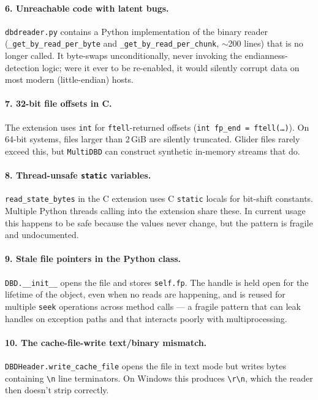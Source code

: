 \documentclass[11pt]{article}
\begin{document}
\paragraph{6. Unreachable code with latent bugs.}
\texttt{dbdreader.py} contains a Python implementation of the binary
reader (\texttt{\_get\_by\_read\_per\_byte} and
\texttt{\_get\_by\_read\_per\_chunk}, $\sim$200 lines) that is no longer
called.  It byte-swaps unconditionally, never invoking the
endianness-detection logic; were it ever to be re-enabled, it would
silently corrupt data on most modern (little-endian) hosts.

\paragraph{7. 32-bit file offsets in C.}
The extension uses \texttt{int} for \texttt{ftell}-returned offsets
(\texttt{int fp\_end = ftell(\dots)}).  On 64-bit systems, files larger
than 2\,GiB are silently truncated.  Glider files rarely exceed this, but
\texttt{MultiDBD} can construct synthetic in-memory streams that do.

\paragraph{8. Thread-unsafe \texttt{static} variables.}
\texttt{read\_state\_bytes} in the C extension uses C \texttt{static}
locals for bit-shift constants.  Multiple Python threads calling into the
extension share these.  In current usage this happens to be safe because
the values never change, but the pattern is fragile and undocumented.

\paragraph{9. Stale file pointers in the Python class.}
\texttt{DBD.\_\_init\_\_} opens the file and stores
\texttt{self.fp}.  The handle is held open for the lifetime of the object,
even when no reads are happening, and is reused for multiple \texttt{seek}
operations across method calls — a fragile pattern that can leak handles
on exception paths and that interacts poorly with multiprocessing.

\paragraph{10. The cache-file-write text/binary mismatch.}
\texttt{DBDHeader.write\_cache\_file} opens the file in text mode but
writes bytes containing \texttt{\textbackslash{}n} line terminators.  On
Windows this produces \texttt{\textbackslash{}r\textbackslash{}n}, which
the reader then doesn't strip correctly.
\end{document}
